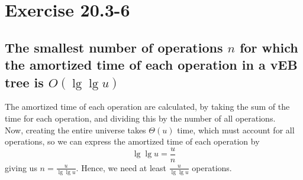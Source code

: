 \section*{Exercise 20.3-6}
\subsection*{The smallest number of operations $n$ for which the amortized time of each operation in a vEB tree is $O(\lg\lg u)$}

The amortized time of each operation are calculated, by taking the sum of the time for each operation, and dividing this by the number of all operations.
\\
Now, creating the entire universe takes $\Theta (u)$ time, which must account for all operations, so we can express the amortized time of each operation by
$$
\lg\lg u = \frac{u}{n}
$$
giving us $n = \frac{u}{\lg\lg u}$. Hence, we need at least $\frac{u}{\lg\lg u}$ operations.